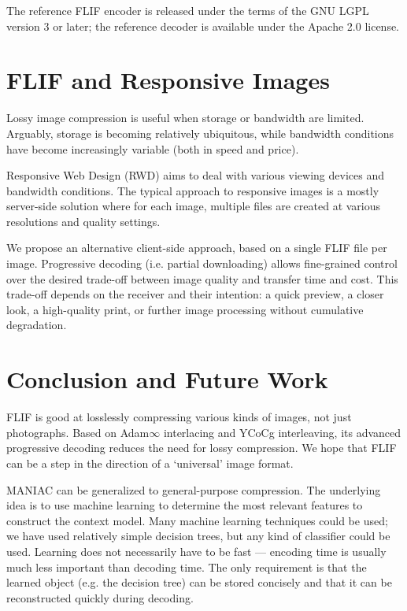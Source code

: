 \documentclass{article}
\begin{document}
The reference FLIF encoder \cite{flif_website, flif_implementation}
is released under the terms of the GNU LGPL version 3 or later;
the reference decoder is available under the Apache 2.0 license.


\section{FLIF and Responsive Images}
\label{sec:conclusion}

Lossy image compression is useful when storage or bandwidth are limited.
Arguably, %
storage is becoming relatively ubiquitous, while bandwidth conditions
have become increasingly variable (both in speed and price).

Responsive Web Design (RWD) aims to deal with various viewing devices and bandwidth conditions.
The typical approach to responsive images
is a mostly server-side solution where for each image, multiple files are created at various resolutions and quality settings.

We propose an alternative client-side approach, based on a single FLIF file per image.
Progressive decoding (i.e. partial downloading) allows fine-grained control over the desired
trade-off between image quality and transfer time and cost.
This trade-off depends on the receiver and their intention:
a quick preview,
a closer look,
a high-quality print,
or further image processing without cumulative degradation.

\section{Conclusion and Future Work}

FLIF is good at losslessly compressing various kinds of images, not just photographs.
Based on Adam$\infty$ interlacing and YCoCg interleaving,
its advanced progressive decoding
reduces the need for lossy compression.
We hope that FLIF can be a step in the direction of a `universal' image format.

MANIAC can be generalized to general-purpose compression.
%
The underlying idea is to use machine learning to determine the most relevant features to construct the context model.
Many machine learning techniques could be used; we have used relatively simple decision trees, but any kind of classifier could be used.
Learning does not necessarily have to be fast --- encoding time is usually much less important than decoding time.
The only requirement is that the learned object (e.g. the decision tree) can be stored concisely and
that it can be reconstructed quickly during decoding.
\end{document}
